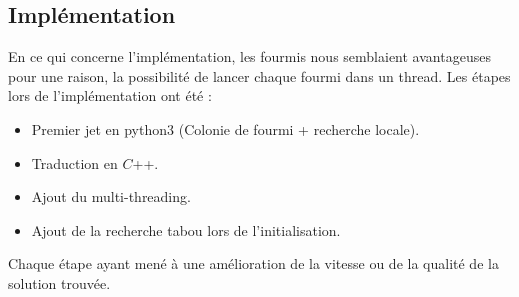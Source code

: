 \documentclass[b]{beamer}
\begin{document}
\subsection{Implémentation}
\begin{frame}
En ce qui concerne l'implémentation, les fourmis nous semblaient avantageuses pour une raison, la possibilité de lancer chaque fourmi dans un thread. Les étapes lors de l'implémentation ont été :
\begin{itemize}
	\item Premier jet en python3 (Colonie de fourmi + recherche locale).
	\item Traduction en $C$++.
	\item Ajout du multi-threading.
	\item Ajout de la recherche tabou lors de l'initialisation.
\end{itemize}
Chaque étape ayant mené à une amélioration de la vitesse ou de la qualité de la solution trouvée.
\end{frame}
\end{document}
